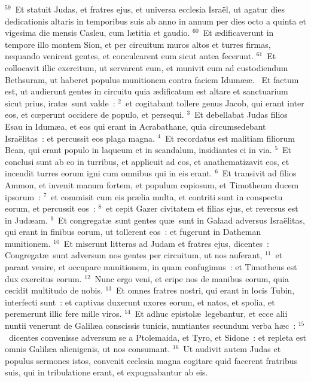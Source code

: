 ${}^{59}$~Et statuit Judas, et fratres ejus, et universa ecclesia Isra\"el, ut agatur dies dedicationis altaris in temporibus suis ab anno in annum per dies octo a quinta et vigesima die mensis Casleu, cum l\ae titia et gaudio.
${}^{60}$~Et \ae dificaverunt in tempore illo montem Sion, et per circuitum muros altos et turres firmas, nequando venirent gentes, et conculcarent eum sicut antea fecerunt.
${}^{61}$~Et collocavit illic exercitum, ut servarent eum, et munivit eum ad custodiendum Bethsuram, ut haberet populus munitionem contra faciem Idum\ae \ae .
~Et factum est, ut audierunt gentes in circuitu quia \ae dificatum est altare et sanctuarium sicut prius, irat\ae\ sunt valde~:
${}^{2}$~et cogitabant tollere genus Jacob, qui erant inter eos, et cœperunt occidere de populo, et persequi.
${}^{3}$~Et debellabat Judas filios Esau in Idum\ae a, et eos qui erant in Acrabathane, quia circumsedebant Isra\"elitas~: et percussit eos plaga magna.
${}^{4}$~Et recordatus est malitiam filiorum Bean, qui erant populo in laqueum et in scandalum, insidiantes ei in via.
${}^{5}$~Et conclusi sunt ab eo in turribus, et applicuit ad eos, et anathematizavit eos, et incendit turres eorum igni cum omnibus qui in eis erant.
${}^{6}$~Et transivit ad filios Ammon, et invenit manum fortem, et populum copiosum, et Timotheum ducem ipsorum~:
${}^{7}$~et commisit cum eis pr\ae lia multa, et contriti sunt in conspectu eorum, et percussit eos~:
${}^{8}$~et cepit Gazer civitatem et filias ejus, et reversus est in Jud\ae am.
${}^{9}$~Et congregat\ae\ sunt gentes qu\ae\ sunt in Galaad adversus Isra\"elitas, qui erant in finibus eorum, ut tollerent eos~: et fugerunt in Datheman munitionem.
${}^{10}$~Et miserunt litteras ad Judam et fratres ejus, dicentes~: Congregat\ae\ sunt adversum nos gentes per circuitum, ut nos auferant,
${}^{11}$~et parant venire, et occupare munitionem, in quam confugimus~: et Timotheus est dux exercitus eorum.
${}^{12}$~Nunc ergo veni, et eripe nos de manibus eorum, quia cecidit multitudo de nobis.
${}^{13}$~Et omnes fratres nostri, qui erant in locis Tubin, interfecti sunt~: et captivas duxerunt uxores eorum, et natos, et spolia, et peremerunt illic fere mille viros.
${}^{14}$~Et adhuc epistol\ae\ legebantur, et ecce alii nuntii venerunt de Galil\ae a conscissis tunicis, nuntiantes secundum verba h\ae c~:
${}^{15}$~dicentes convenisse adversum se a Ptolemaida, et Tyro, et Sidone~: et repleta est omnis Galil\ae a alienigenis, ut nos consumant.
${}^{16}$~Ut audivit autem Judas et populus sermones istos, convenit ecclesia magna cogitare quid facerent fratribus suis, qui in tribulatione erant, et expugnabantur ab eis.



